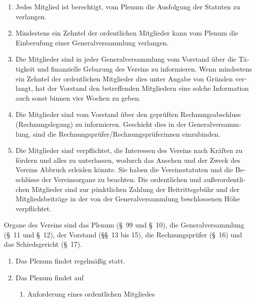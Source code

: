 \begin{otherlanguage}{german}
\begin{enumerate}[statutenenum]
    \item Jedes Mitglied ist berechtigt, vom Plenum die Ausfolgung der Statuten zu verlangen.

    \item Mindestens ein Zehntel der ordentlichen Mitglieder kann vom Plenum die Einberufung einer Generalversammlung verlangen.

    \item Die Mitglieder sind in jeder Generalversammlung vom Vorstand über die Tätigkeit und finanzielle Gebarung des Vereins zu informieren.
        Wenn mindestens ein Zehntel der ordentlichen Mitglieder dies unter Angabe von Gründen verlangt, hat der Vorstand den betreffenden Mitgliedern eine solche Information auch sonst binnen vier Wochen zu geben.

    \item Die Mitglieder sind vom Vorstand über den geprüften Rechnungsabschluss (Rechnungslegung) zu informieren.
        Geschieht dies in der Generalversammlung, sind die Rechnungsprüfer/Rechnungsprüferinnen einzubinden.

    \item Die Mitglieder sind verpflichtet, die Interessen des Vereins nach Kräften zu fördern und alles zu unterlassen, wodurch das Ansehen und der Zweck des Vereins Abbruch erleiden könnte.
        Sie haben die Vereinsstatuten und die Beschlüsse der Vereinsorgane zu beachten.
        Die ordentlichen und außerordentlichen Mitglieder sind zur pünktlichen Zahlung der Beitrittsgebühr und der Mitgliedsbeiträge in der von der Generalversammlung beschlossenen Höhe verpflichtet.
\end{enumerate}


Organe des Vereins sind das Plenum (\S\ 99 und \S\ 10), die Generalversammlung (\S\ 11 und \S\ 12), der Vorstand (\S\S\ 13 bis 15), die Rechnungsprüfer (\S\ 16) und das Schiedsgericht (\S\ 17).


\begin{enumerate}[statutenenum]
    \item Das Plenum findet regelmäßig statt.

    \item Das Plenum findet auf
        \begin{enumerate}[statutenenum]
            \item Anforderung eines ordentlichen Mitgliedes


\end{enumerate}
\end{enumerate}
\end{otherlanguage}
